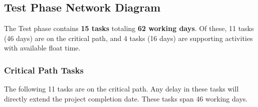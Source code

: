 
\subsection{Test Phase Network Diagram}

The Test phase contains \textbf{15 tasks} totaling \textbf{62 working days}. 
Of these, 11 tasks (46 days) are on the critical path, 
and 4 tasks (16 days) are supporting activities with available float time.

\vspace{0.5em}

\subsubsection{Critical Path Tasks}

\noindent The following 11 tasks are on the critical path. 
Any delay in these tasks will directly extend the project completion date. 
These tasks span 46 working days.

\vspace{0.5em}

